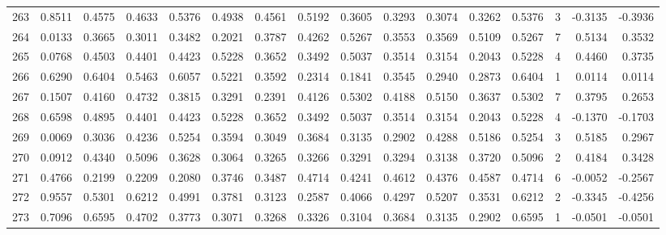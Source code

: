 \begin{tabular}{lrrrrrrrrrrrrrrr}
263 &      0.8511 &  0.4575 &  0.4633 &  0.5376 &  0.4938 &  0.4561 &  0.5192 &  0.3605 &  0.3293 &  0.3074 &   0.3262 &     0.5376 &      3 &                   -0.3135 &                    -0.3936 \\
264 &      0.0133 &  0.3665 &  0.3011 &  0.3482 &  0.2021 &  0.3787 &  0.4262 &  0.5267 &  0.3553 &  0.3569 &   0.5109 &     0.5267 &      7 &                    0.5134 &                     0.3532 \\
265 &      0.0768 &  0.4503 &  0.4401 &  0.4423 &  0.5228 &  0.3652 &  0.3492 &  0.5037 &  0.3514 &  0.3154 &   0.2043 &     0.5228 &      4 &                    0.4460 &                     0.3735 \\
266 &      0.6290 &  0.6404 &  0.5463 &  0.6057 &  0.5221 &  0.3592 &  0.2314 &  0.1841 &  0.3545 &  0.2940 &   0.2873 &     0.6404 &      1 &                    0.0114 &                     0.0114 \\
267 &      0.1507 &  0.4160 &  0.4732 &  0.3815 &  0.3291 &  0.2391 &  0.4126 &  0.5302 &  0.4188 &  0.5150 &   0.3637 &     0.5302 &      7 &                    0.3795 &                     0.2653 \\
268 &      0.6598 &  0.4895 &  0.4401 &  0.4423 &  0.5228 &  0.3652 &  0.3492 &  0.5037 &  0.3514 &  0.3154 &   0.2043 &     0.5228 &      4 &                   -0.1370 &                    -0.1703 \\
269 &      0.0069 &  0.3036 &  0.4236 &  0.5254 &  0.3594 &  0.3049 &  0.3684 &  0.3135 &  0.2902 &  0.4288 &   0.5186 &     0.5254 &      3 &                    0.5185 &                     0.2967 \\
270 &      0.0912 &  0.4340 &  0.5096 &  0.3628 &  0.3064 &  0.3265 &  0.3266 &  0.3291 &  0.3294 &  0.3138 &   0.3720 &     0.5096 &      2 &                    0.4184 &                     0.3428 \\
271 &      0.4766 &  0.2199 &  0.2209 &  0.2080 &  0.3746 &  0.3487 &  0.4714 &  0.4241 &  0.4612 &  0.4376 &   0.4587 &     0.4714 &      6 &                   -0.0052 &                    -0.2567 \\
272 &      0.9557 &  0.5301 &  0.6212 &  0.4991 &  0.3781 &  0.3123 &  0.2587 &  0.4066 &  0.4297 &  0.5207 &   0.3531 &     0.6212 &      2 &                   -0.3345 &                    -0.4256 \\
273 &      0.7096 &  0.6595 &  0.4702 &  0.3773 &  0.3071 &  0.3268 &  0.3326 &  0.3104 &  0.3684 &  0.3135 &   0.2902 &     0.6595 &      1 &                   -0.0501 &                    -0.0501 \\

\end{tabular}
